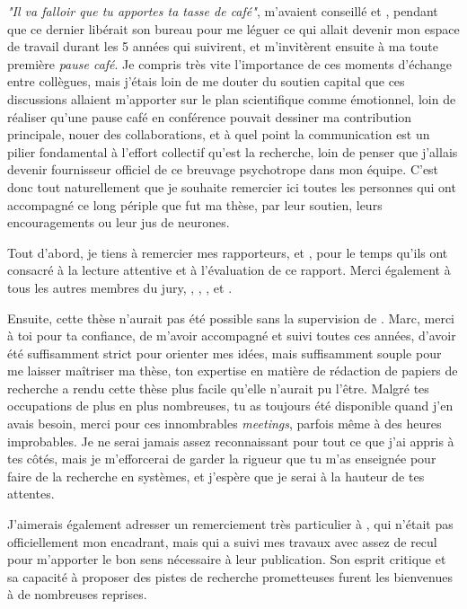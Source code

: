 %


\textit{"Il va falloir que tu apportes ta tasse de café"},
m'avaient conseillé  et ,
pendant que ce dernier libérait son bureau pour me léguer
ce qui allait devenir mon espace de travail durant les 5 années qui suivirent,
et m'invitèrent ensuite à ma toute première \textit{pause café}.
Je compris très vite l'importance de ces moments d'échange entre collègues,
mais j'étais loin de me douter du soutien capital que ces discussions allaient
m'apporter sur le plan scientifique comme émotionnel,
loin de réaliser qu'une pause café en conférence pouvait dessiner 
ma contribution principale, nouer des collaborations,
et à quel point la communication est un pilier fondamental à l'effort 
collectif qu'est la recherche,
loin de penser que j'allais devenir fournisseur officiel de ce breuvage psychotrope
dans mon équipe.
C'est donc tout naturellement que je souhaite remercier ici toutes les personnes qui
ont accompagné ce long périple que fut ma thèse, par leur soutien, 
leurs encouragements ou leur jus de neurones.

Tout d'abord, 
je tiens à remercier mes rapporteurs,
 et ,
pour le temps qu'ils ont consacré à la lecture attentive et à l'évaluation
de ce rapport.
Merci également à tous les autres membres du jury,
, , , 
 et .

Ensuite, 
cette thèse n'aurait pas été possible sans la supervision de 
. 
Marc, 
merci à toi pour ta confiance, 
de m'avoir accompagné et suivi toutes ces années, 
d'avoir été suffisamment strict pour orienter mes idées,
mais suffisamment souple pour me laisser maîtriser ma thèse,
ton expertise en matière de rédaction de papiers de recherche
a rendu cette thèse plus facile qu'elle n'aurait pu l'être.
Malgré tes occupations de plus en plus nombreuses,
tu as toujours été disponible quand j'en avais besoin,
merci pour ces innombrables \emph{meetings},
parfois même à des heures improbables.
Je ne serai jamais assez reconnaissant pour tout ce que j'ai appris à tes côtés,
mais je m'efforcerai de garder la rigueur que tu m'as enseignée pour faire de la 
recherche en systèmes,
et j'espère que je serai à la hauteur de tes attentes.

J'aimerais également adresser un remerciement très particulier à ,
qui n'était pas officiellement mon encadrant,
mais qui a suivi mes travaux avec assez de recul pour m'apporter le bon sens 
nécessaire à leur publication.
Son esprit critique et sa capacité à proposer des pistes de recherche 
prometteuses furent les bienvenues à de nombreuses reprises.

